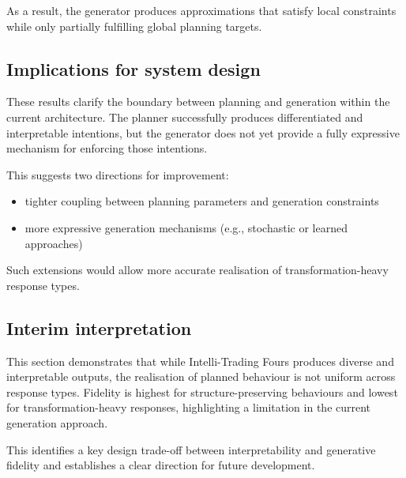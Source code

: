 As a result, the generator produces approximations that satisfy local
constraints while only partially fulfilling global planning targets.

\subsection{Implications for system design}\label{implications-for-system-design}

These results clarify the boundary between planning and generation
within the current architecture. The planner successfully produces
differentiated and interpretable intentions, but the generator does not
yet provide a fully expressive mechanism for enforcing those intentions.

This suggests two directions for improvement:

\begin{itemize}
\item
  tighter coupling between planning parameters and generation
  constraints
\item
  more expressive generation mechanisms (e.g., stochastic or learned
  approaches)
\end{itemize}

Such extensions would allow more accurate realisation of
transformation-heavy response types.

\subsection{Interim interpretation}\label{interim-interpretation-2}

This section demonstrates that while Intelli-Trading Fours produces
diverse and interpretable outputs, the realisation of planned behaviour
is not uniform across response types. Fidelity is highest for
structure-preserving behaviours and lowest for transformation-heavy
responses, highlighting a limitation in the current generation approach.

This identifies a key design trade-off between interpretability and
generative fidelity and establishes a clear direction for future
development.

